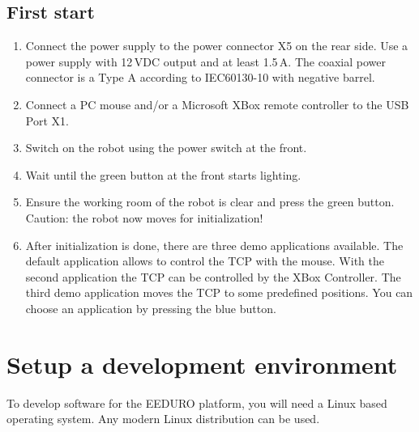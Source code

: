 \section{First start}
\begin{enumerate}
	\item Connect the power supply to the power connector X5 on the rear side. Use a power supply with 12\,VDC output and at least 1.5\,A. The coaxial power connector is a Type A according to IEC60130-10 with negative barrel.
	\item Connect a PC mouse and/or a Microsoft XBox remote controller to the USB Port X1.
	\item Switch on the robot using the power switch at the front.
	\item Wait until the green button at the front starts lighting.
	\item Ensure the working room of the robot is clear and press the green button. Caution: the robot now moves for initialization!
	\item After initialization is done, there are three demo applications available. The default application allows to control the TCP with the mouse. With the second application the TCP can be controlled by the XBox Controller. The third demo application moves the TCP to some predefined positions. You can choose an application by pressing the blue button.
\end{enumerate}

\chapter{Setup a development environment}
To develop software for the EEDURO platform, you will need a Linux based operating system. Any modern Linux distribution can be used.

